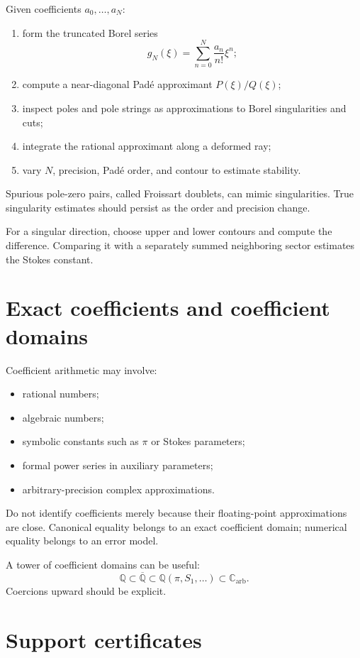 \documentclass[11pt,openany]{book}
\theoremstyle{definition}
\theoremstyle{plain}
\theoremstyle{remark}
\newcommand{\C}{\mathbb{C}}
\newcommand{\Q}{\mathbb{Q}}
\begin{document}
Given coefficients $a_0,\dots,a_N$:
\begin{enumerate}
 \item form the truncated Borel series
 \[
  g_N(\xi)=\sum_{n=0}^N\frac{a_n}{n!}\xi^n;
 \]
 \item compute a near-diagonal Pad\'e approximant $P(\xi)/Q(\xi)$;
 \item inspect poles and pole strings as approximations to Borel singularities and cuts;
 \item integrate the rational approximant along a deformed ray;
 \item vary $N$, precision, Pad\'e order, and contour to estimate stability.
\end{enumerate}

Spurious pole-zero pairs, called Froissart doublets, can mimic singularities. True singularity estimates should persist as the order and precision change.

For a singular direction, choose upper and lower contours and compute the difference. Comparing it with a separately summed neighboring sector estimates the Stokes constant.

\section{Exact coefficients and coefficient domains}

Coefficient arithmetic may involve:
\begin{itemize}
 \item rational numbers;
 \item algebraic numbers;
 \item symbolic constants such as $\pi$ or Stokes parameters;
 \item formal power series in auxiliary parameters;
 \item arbitrary-precision complex approximations.
\end{itemize}

Do not identify coefficients merely because their floating-point approximations are close. Canonical equality belongs to an exact coefficient domain; numerical equality belongs to an error model.

A tower of coefficient domains can be useful:
\[
 \Q\subset\overline{\Q}\subset
 \Q(\pi,S_1,\dots)\subset\C_{\mathrm{arb}}.
\]
Coercions upward should be explicit.

\section{Support certificates}
\end{document}

